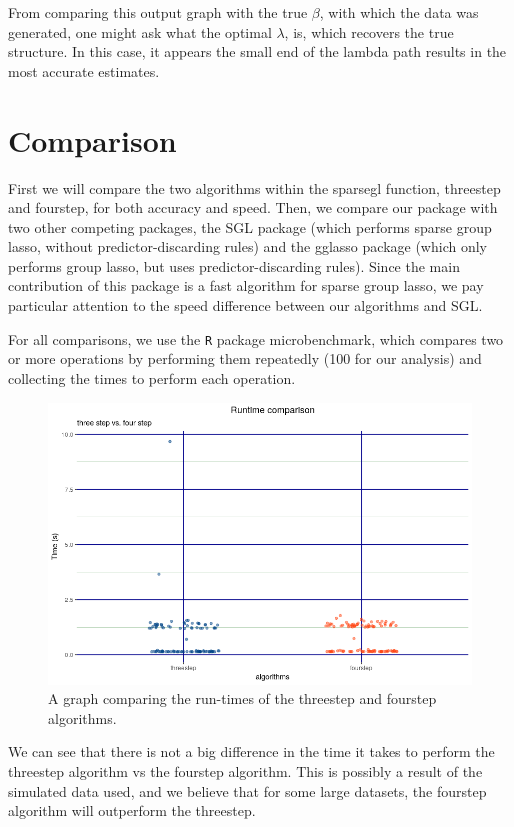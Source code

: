 \documentclass[12pt]{article}
\newcommand{\pkg}[1]{{\normalfont\fontseries{b}\selectfont #1}}
\begin{document}
From comparing this output graph with the true $\beta$, with which the data was generated, one might ask what the optimal $\lambda$, is, which recovers the true structure. In this case, it appears the small end of the lambda path results in the most accurate estimates.


\section{Comparison}

First we will compare the two algorithms within the sparsegl function, threestep and fourstep, for both accuracy and speed. Then, we compare our package with two other competing packages, the \pkg{SGL} package (which performs sparse group lasso, without predictor-discarding rules) and the \pkg{gglasso} package (which only performs group lasso, but uses predictor-discarding rules). Since the main contribution of this package is a fast algorithm for sparse group lasso, we pay particular attention to the speed difference between our algorithms and SGL.

For all comparisons, we use the \texttt{R} package \pkg{microbenchmark}, which compares two or more operations by performing them repeatedly (100 for our analysis) and collecting the times to perform each operation.

\begin{figure}[tb!]
\centering
\includegraphics[scale=0.5]{threefour2.png}
\caption{A graph comparing the run-times of the threestep and fourstep algorithms.}
\label{fig:threevsfour}
\end{figure}


We can see that there is not a big difference in the time it takes to perform the threestep algorithm vs the fourstep algorithm. This is possibly a result of the simulated data used, and we believe that for some large datasets, the fourstep algorithm will outperform the threestep.
\end{document}
